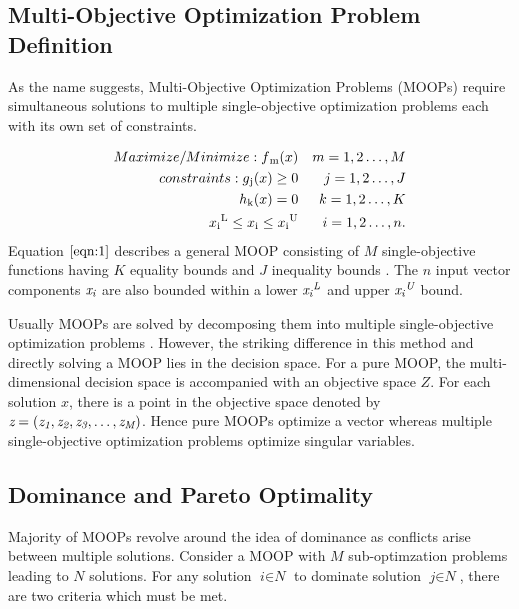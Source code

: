 \documentclass[conference]{IEEEtran}
\begin{document}
\subsection{Multi-Objective Optimization Problem Definition}

As the name suggests, Multi-Objective Optimization Problems (MOOPs) require simultaneous solutions to multiple single-objective optimization problems each with its own set of constraints. 

{\scriptsize
\begin{align}
\label{eqn:1}
Maximize/Minimize:f\textsubscript{m}(x)& &  m = 1,2\dots,M \\
constraints:g\textsubscript{j}(x) \ge 0& & j=1,2\dots,J \nonumber\\
h\textsubscript{k}(x) = 0& & k=1,2\dots,K \nonumber\\
x\textsubscript{i}\textsuperscript{L} \le x\textsubscript{i} \le x\textsubscript{i}\textsuperscript{U} && i = 1,2\dots,n.\nonumber 
\end{align}
}%
Equation $\ref{eqn:1}$ describes a general MOOP consisting of $\textit{M}$ single-objective functions having $\textit{K}$ equality bounds and $\textit{J}$ inequality bounds \cite{chankong}. The $\textit{n}$ input vector components $\textit{x\textsubscript{i}}$ are also bounded within a lower $\textit{x\textsubscript{i}\textsuperscript{L}}$ and upper $\textit{x\textsubscript{i}\textsuperscript{U}}$ bound.

Usually MOOPs are solved by decomposing them into multiple single-objective optimization problems \cite{liu}. However, the striking difference in this method and directly solving a MOOP lies in the decision space. For a pure MOOP, the multi-dimensional decision space is accompanied with an objective space $\textit{Z}$. For each solution $\textit{x}$, there is a point in the objective space denoted by $\textit{z} = (\textit{z\textsubscript{1}}, \textit{z\textsubscript{2}}, \textit{z\textsubscript{3}}, \dots, \textit{z\textsubscript{M}})$. Hence pure MOOPs optimize a vector \cite{Deb} whereas multiple single-objective optimization problems optimize singular variables. 

\subsection{Dominance and Pareto Optimality}

Majority of MOOPs revolve around the idea of dominance as conflicts arise between multiple solutions. Consider a MOOP with $\textit{M}$ sub-optimzation problems leading to $\textit{N}$ solutions. For any solution $\textit{i} \in \textit{N}$ to dominate solution $\textit{j} \in \textit{N}$, there are two criteria which must be met.
\end{document}

